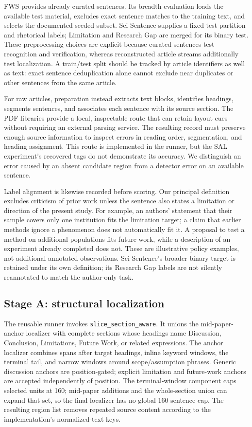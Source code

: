 FWS provides already curated sentences. Its breadth evaluation loads the available test material,
excludes exact sentence matches to the training text, and selects the documented seeded subset.
Sci-Sentence supplies a fixed test partition and rhetorical labels; Limitation and Research Gap
are merged for its binary test. These preprocessing choices are explicit because curated
sentences test recognition and verification, whereas reconstructed article streams additionally
test localization. A train/test split should be tracked by article identifiers as well as text:
exact sentence deduplication alone cannot exclude near duplicates or other sentences from the
same article.

For raw articles, preparation instead extracts text blocks, identifies headings, segments
sentences, and associates each sentence with its source section. The PDF libraries provide a
local, inspectable route that can retain layout cues without requiring an external parsing service.
The resulting record must preserve enough source information to inspect errors in reading order,
segmentation, and heading assignment. This route is implemented in the runner, but the SAL
experiment's recovered tags do not demonstrate its accuracy. We distinguish an error caused by
an absent candidate region from a detector error on an available sentence.

Label alignment is likewise recorded before scoring. Our principal definition excludes criticism
of prior work unless the sentence also states a limitation or direction of the present study.
For example, an authors' statement that their sample covers only one institution fits the
limitation target; a claim that earlier methods ignore a phenomenon does not automatically fit it.
A proposal to test a method on additional populations fits future work, while a description of an
experiment already completed does not. These are illustrative policy examples, not additional
annotated observations. Sci-Sentence's broader binary target is retained under its own definition;
its Research Gap labels are not silently reannotated to match the author-only task.

\subsection{Stage A: structural localization}
\label{S:stage-a}

The reusable runner invokes \texttt{slice\_section\_aware}. It unions the mid-paper-anchor
localizer with complete sections whose headings name Discussion, Conclusion, Limitations,
Future Work, or related expressions. The anchor localizer combines spans after target headings,
inline keyword windows, the terminal tail, and narrow windows around scope/assumption phrases.
Generic discussion anchors are position-gated; explicit limitation and future-work anchors are
accepted independently of position. The terminal-window component caps selected units at 160; mid-paper additions and the
whole-section union can expand that set, so the final localizer has no global 160-sentence cap. The resulting region list removes
repeated source content according to the implementation's normalized-text keys.

